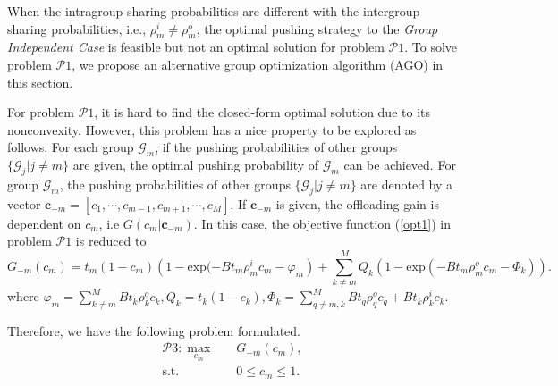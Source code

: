 \documentclass[12pt, draftclsnofoot, onecolumn]{IEEEtran}
\begin{document}
When the intragroup sharing probabilities are different with the intergroup sharing probabilities, i.e., $\rho_m^i \neq \rho_m^o$, the optimal pushing strategy to the \textit{Group Independent Case} is feasible but not an optimal solution for problem $\mathcal{P}1$.
To solve problem $\mathcal{P}1$, we propose an alternative group optimization algorithm (AGO) in this section.

For problem $\mathcal{P}1$, it is hard to find the closed-form optimal solution due to its nonconvexity.
However, this problem has a nice property to be explored as follows.
For each group $\mathcal{G}_m$, if the pushing probabilities of other groups $\{\mathcal{G}_j| j \neq m\}$ are given, the optimal pushing probability of $\mathcal{G}_m$ can be achieved.
For group $\mathcal{G}_m$, the pushing probabilities of other groups $\{\mathcal{G}_j| j \neq m\}$ are denoted by a vector $\bm{c}_{-m} = [c_1, \cdots,c_{m-1},c_{m+1},\cdots, c_M]$.
If $\bm{c}_{-m}$ is given, the offloading gain is dependent on $c_m$, i.e $G(c_m|\bm{c}_{-m})$.
In this case, the objective function (\ref{opt1}) in problem $\mathcal{P}1$ is reduced to
\begin{equation}
G_{-m}(c_m) = t_m  (1- c_m)\left (1 - \textrm{exp}(-B t_m \rho_m^i c_m - \varphi_m \right) + \sum_{k \neq m}^M Q_k\left(1 - \textrm{exp}(-B t_m \rho_m^o c_m - \Phi_k)\right) \nonumber.
\end{equation}
where
$\varphi_m =\sum_{k \neq m}^M B t_k \rho_k^o c_k,
Q_k = t_k  (1- c_k),
\Phi_k = \sum_{q \neq m,k}^M B t_q \rho_q^o c_q + B t_k \rho_k^i c_k.$

Therefore, we have the following problem formulated.
\begin{subequations}
\begin{align}
 \mathcal{P}3:\mathop{\max }_{c_m}
                  &\quad   G_{-m}(c_m),  \label{opt3}\\
\textrm{s.t.} &\quad 0\leq c_m \leq 1.
\end{align}
\end{subequations}
\end{document}

